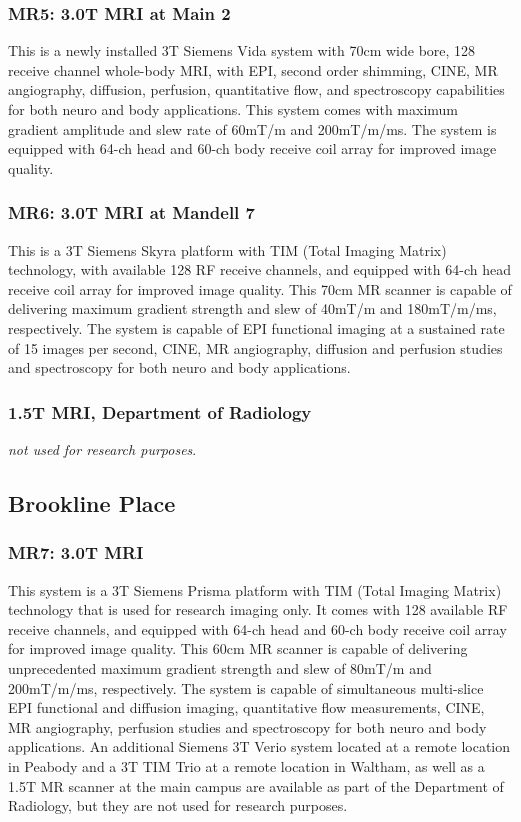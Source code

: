 \documentclass[11pt]{amsart}
\begin{document}
\hypertarget{x-mr5:-3.0t-mri-at-main-2}{\subsubsection*{MR5: 3.0T MRI at Main 2}}
This is a newly installed 3T Siemens Vida system with 70cm wide bore, 128 receive channel whole-body MRI, with EPI, second order shimming, CINE, MR angiography, diffusion, perfusion, quantitative flow, and spectroscopy capabilities for both neuro and body applications. This system comes with maximum gradient amplitude and slew rate of 60mT/m and 200mT/m/ms. The system is equipped with 64-ch head and 60-ch body receive coil array for improved image quality.


\hypertarget{x-mr6:-3.0t-mri-at-mandell-7}{\subsubsection*{MR6: 3.0T MRI at Mandell 7}}
This is a 3T Siemens Skyra platform with TIM (Total Imaging Matrix) technology, with available 128 RF receive channels, and equipped with 64-ch head receive coil array for improved image quality. This 70cm MR scanner is capable of delivering maximum gradient strength and slew of 40mT/m and 180mT/m/ms, respectively. The system is capable of EPI functional imaging at a sustained rate of 15 images per second, CINE, MR angiography, diffusion and perfusion studies and spectroscopy for both neuro and body applications.


\hypertarget{x-1.5t-mri,-department-of-radiology}{\subsubsection*{1.5T MRI, Department of Radiology}}
\emph{not used for research purposes}.


\hypertarget{x-brookline-place}{\subsection*{Brookline Place}}
\hypertarget{x-mr7:-3.0t-mri}{\subsubsection*{MR7: 3.0T MRI}}
This system is a 3T Siemens Prisma platform with TIM (Total Imaging Matrix) technology that is used for research imaging only. It comes with 128 available RF receive channels, and equipped with 64-ch head and 60-ch body receive coil array for improved image quality. This 60cm MR scanner is capable of delivering unprecedented maximum gradient strength and slew of 80mT/m and 200mT/m/ms, respectively. The system is capable of simultaneous multi-slice EPI functional and diffusion imaging, quantitative flow measurements, CINE, MR angiography, perfusion studies and spectroscopy for both neuro and body applications. An additional Siemens 3T Verio system located at a remote location in Peabody and a 3T TIM Trio at a remote location in Waltham, as well as a 1.5T MR scanner at the main campus are available as part of the Department of Radiology, but they are not used for research purposes.
\end{document}
